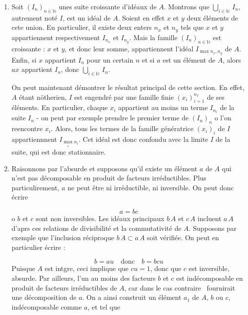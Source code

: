 \begin{sol}
\begin{enumerate}
\item Soit \((I_n)_{n\in\mathbb{N}}\) unes suite croissante d'id\'eaux de \(A\). %
Montrons que \(\bigcup\limits_{i\in\mathbb{N}}\,I_n\), autrement not\'e \(I\), est un id\'eal de \(A\). %
Soient en effet \(x\) et \(y\) deux \'el\'ements de cete union. %
En particulier, il existe deux enters \(n_x\) et \(n_y\) tels que \(x\) et \(y\) appartiennent respectivement  %
\(I_{n_x}\) et \(I_{n_y}\). %
Mais la famille \((I_n)_{n\in\mathbb{N}}\) est croissante : \(x\) et \(y\), et donc leur somme, appartiennent  l'id\'eal \(I_{\max{n_x, n_y}}\) de \(A\). %
Enfin, si \(x\) appartient  \(I_n\) pour un certain \(n\) et si \(a\) est un \'el\'ement de \(A\), %
alors \(ax\) appartient  \(I_n\), donc  \(\bigcup\limits_{i\in\mathbb{N}}\,I_n\).

\par
On peut maintenant d\'emontrer le r\'esultat principal de cette section. %
En effet, \(A\) \'etant n\"otherien, \(I\) est engendr\'e par une famille finie \((x_i)_{i=1}^{n_I}\) de ses \'el\'ements. %
En particulier, chaque \(x_i\) appartient  au moins un terme \(I_{n_i}\) de la suite \(I_n\) %
- on peut par exemple prendre le premier terme de \((I_n)_n\) o l'on reencontre \(x_i\). %
Alors, tous les termes de la famille g\'en\'eratrice \((x_i)_i\) de \(I\) appartiennnent  \(I_{\max\limits_i{n_i}}\). %
Cet id\'eal est donc confondu avec la limite \(I\) de la suite, qui est donc stationnaire.

\item Raisonnons par l'absurde et supposons qu'il existe un \'el\'ement \(a\) de \(A\) qui n'est pas d\'ecomposable en produit de facteurs irr\'eductibles. %
Plus particulirement, \(a\) ne peut \^etre ni irr\'eductible, ni inversible. %
On peut donc \'ecrire

\begin{equation}
a = bc
\label{eq:hyp_a_nondec}
\end{equation}
o \(b\) et \(c\) sont non inversibles. %
Les id\'eaux principaux \(b\,A\) et \(c\,A\) incluent \(a\,A\) d'aprs ces relations de divisibilit\'e et la commutativit\'e de \(A\). %
Supposons par exemple que l'inclusion r\'eciproque \(b\,A\subset a\,A\) soit v\'erifi\'ee. %
On peut en particulier \'ecrire :

\begin{equation}
b=au\quad \text{donc} \quad b=bcu
\label{eq:}
\end{equation}
Puisque \(A\) est intgre, ceci implique que \(cu=1\), donc que \(c\) est inversible, absurde. %
Par ailleurs, l'un au moins des facteurs \(b\) et \(c\) est ind\'ecomposable en produit de facteurs irr\'eductibles de \(A\), %
car dans le cas contraire~ fournirait une d\'ecomposition de \(a\). %
On a ainsi construit un \'el\'ement \(a_1\) de \(A\), \(b\) ou \(c\), %
ind\'ecomposable comme \(a\), et tel que


\end{enumerate}
\end{sol}
